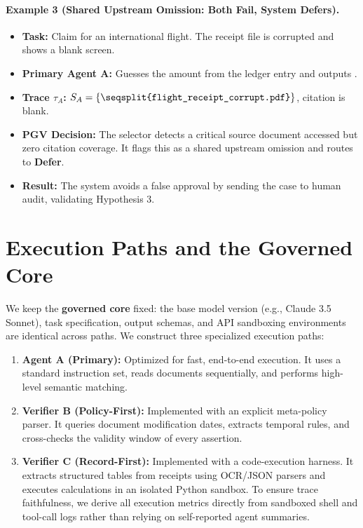 \documentclass[manuscript,screen,nonacm]{acmart}
\newcommand{\code}[1]{\texttt{\seqsplit{#1}}}
\begin{document}
\paragraph{Example 3 (Shared Upstream Omission: Both Fail, System Defers).}
\begin{itemize}
    \item \textbf{Task:} Claim for an international flight. The receipt file is corrupted and shows a blank screen.
    \item \textbf{Primary Agent A:} Guesses the amount from the ledger entry and outputs \code{Approved(850.00)}.
    \item \textbf{Trace $\tau_A$:} $S_A = \{\text{\code{flight\_receipt\_corrupt.pdf}}\}$, citation is blank.
    \item \textbf{PGV Decision:} The selector detects a critical source document accessed but zero citation coverage. It flags this as a shared upstream omission and routes to \textbf{Defer}.
    \item \textbf{Result:} The system avoids a false approval by sending the case to human audit, validating Hypothesis 3.
\end{itemize}

\section{Execution Paths and the Governed Core}
\label{sec:paths}

We keep the \textbf{governed core} fixed: the base model version (e.g., Claude 3.5 Sonnet), task specification, output schemas, and API sandboxing environments are identical across paths. We construct three specialized execution paths:
\begin{enumerate}
    \item \textbf{Agent A (Primary):} Optimized for fast, end-to-end execution. It uses a standard instruction set, reads documents sequentially, and performs high-level semantic matching.
    \item \textbf{Verifier B (Policy-First):} Implemented with an explicit meta-policy parser. It queries document modification dates, extracts temporal rules, and cross-checks the validity window of every assertion.
    \item \textbf{Verifier C (Record-First):} Implemented with a code-execution harness. It extracts structured tables from receipts using OCR/JSON parsers and executes calculations in an isolated Python sandbox. To ensure trace faithfulness, we derive all execution metrics directly from sandboxed shell and tool-call logs rather than relying on self-reported agent summaries.
\end{enumerate}
\end{document}
